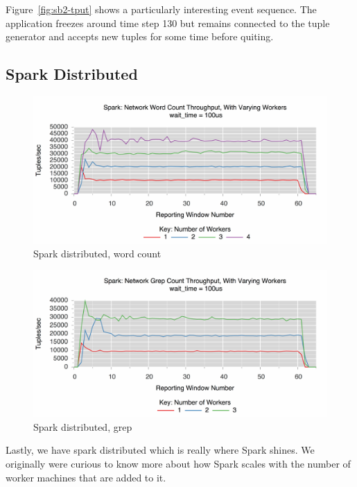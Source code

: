Figure~\ref{fig:sb2-tput} shows a particularly interesting event sequence. The 
application freezes around time step 130 but remains connected to the tuple generator
and accepts new tuples for some time before quiting.

\subsection{Spark Distributed}
\label{ssec:spark-dist1}

\begin{figure}[t]
\centering
\includegraphics[width=1\linewidth]{figures/spark-wc-dist.pdf}
\caption{Spark distributed, word count}
\label{fig:spark-wc-dist}
\end{figure}


\begin{figure}[t]
\centering
\includegraphics[width=1\linewidth]{figures/spark-grep-dist.pdf}
\caption{Spark distributed, grep}
\label{fig:spark-grep-dist}
\end{figure}

Lastly, we have spark distributed which is really where Spark shines. We originally 
were curious to know more about how Spark scales with the number of worker machines
that are added to it.


